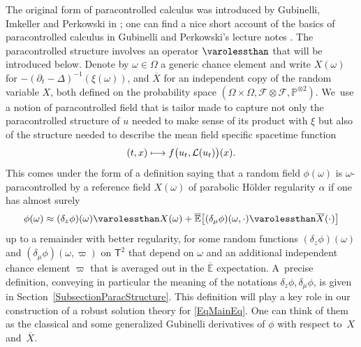 \documentclass[JEP,XML,SOM,Unicode,published]{cedram}
\newcommand\mto{\mathchoice{\longmapsto}{\mapsto}{\mapsto}{\mapsto}}
\theoremstyle{definition}
\newcommand\bbE{\mathbb{E}}
\newcommand{\bsfT}{\mathbf{\mathsf{T}}}
\newcommand{\mcF}{\mathcal{F}}
\newcommand{\mcL}{\mathcal{L}}
\newcommand{\bbP}{\mathbb{P}}
\begin{document}
The original form of paracontrolled calculus was introduced by Gubinelli, Imkeller and Perkowski in \cite{GIP}; one can find a nice short account of the basics of paracontrolled calculus in Gubinelli and Perkowski's lecture notes \cite{GPEnsaios}. The paracontrolled structure involves an operator $\varolessthan$ that will be introduced below. Denote by $\omega\in\Omega$ a generic chance element and write $X(\omega)$ for $-(\partial_t-\Delta)^{-1}(\xi(\omega))$, and $\overline{X}$ for an independent copy of the random variable $X$, both defined on the probability space $(\Omega\times\Omega,\mcF\otimes\mcF,\bbP^{\otimes 2})$. We~use a notion of paracontrolled field that is tailor made to capture not only the paracontrolled structure of $u$ needed to make sense of its product with $\xi$ but also of the structure needed to describe the mean field specific spacetime function
\[
(t,x)\mto f\bigl(u_t,\mcL(u_t)\bigr)(x).
\]
This comes under the form of a definition saying that a random field $\phi(\omega)$ is $\omega$\nobreakdash-paracontrolled by a reference field $X(\omega)$ of parabolic Hölder regularity $\alpha$ if one has almost surely
\begin{equation} \label{EqDefnOmegaPC}
\phi(\omega) \approx (\delta_z \phi)(\omega) \varolessthan X(\omega) + \overline{\bbE}\bigl[(\delta_\mu \phi)(\omega,\cdot) \varolessthan \overline{X}(\cdot)\bigr]
\end{equation}
up to a remainder with better regularity, for some random functions $(\delta_z \phi)(\omega)$ and $(\delta_\mu \phi)(\omega,\varpi)$ on $\bsfT^2$ that depend on $\omega$ and an additional independent chance element $\varpi$ that is averaged out in the $\overline{\bbE}$ expectation. A~precise definition, conveying in particular the meaning of the notations $\delta_z\phi, \delta_\mu \phi$, is given in Section~\ref{SubsectionParacStructure}. This definition will play a key role in our construction of a robust solution theory for \eqref{EqMainEq}. One can think of them as the classical and some generalized Gubinelli derivatives of $\phi$ with respect to~$X$ and~$\overline{X}$.
\end{document}
